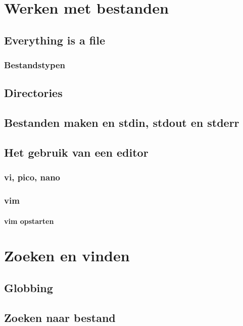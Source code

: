 \documentclass[a4paper,12pt,twoside,openright,titlepage]{book}
\begin{document}
\chapter{Werken met bestanden}
\section{Everything is a file}
\subsection{Bestandstypen}
\section{Directories}
\section{Bestanden maken en stdin, stdout en stderr}


\section{Het gebruik van een editor}

\subsection{vi, pico, nano}

\subsection{vim}

\subsubsection{vim opstarten}






\chapter{Zoeken en vinden}\label{zoekenenvinden}

\section{Globbing}

\section{Zoeken naar bestand}


\end{document}
